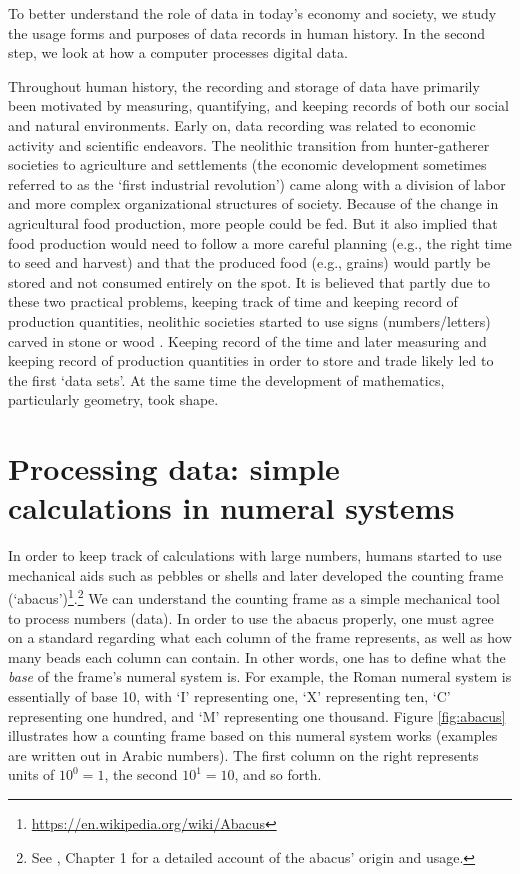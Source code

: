 \documentclass[
  12pt,
]{style/krantz}
\renewcommand{\href}[2]{#2\footnote{\url{#1}}}
\begin{document}
To better understand the role of data in today's economy and society, we study the usage forms and purposes of data records in human history. In the second step, we look at how a computer processes digital data.

Throughout human history, the recording and storage of data have primarily been motivated by measuring, quantifying, and keeping records of both our social and natural environments. Early on, data recording was related to economic activity and scientific endeavors. The neolithic transition from hunter-gatherer societies to agriculture and settlements (the economic development sometimes referred to as the `first industrial revolution') came along with a division of labor and more complex organizational structures of society. Because of the change in agricultural food production, more people could be fed. But it also implied that food production would need to follow a more careful planning (e.g., the right time to seed and harvest) and that the produced food (e.g., grains) would partly be stored and not consumed entirely on the spot. It is believed that partly due to these two practical problems, keeping track of time and keeping record of production quantities, neolithic societies started to use signs (numbers/letters) carved in stone or wood \citep{hogben_1983}. Keeping record of the time and later measuring and keeping record of production quantities in order to store and trade likely led to the first `data sets'. At the same time the development of mathematics, particularly geometry, took shape.

\hypertarget{processing-data-simple-calculations-in-numeral-systems}{%
\section{Processing data: simple calculations in numeral systems}\label{processing-data-simple-calculations-in-numeral-systems}}

In order to keep track of calculations with large numbers, humans started to use mechanical aids such as pebbles or shells and later developed the \href{https://en.wikipedia.org/wiki/Abacus}{counting frame (`abacus')}.\footnote{See \citet{hogben_1983}, Chapter 1 for a detailed account of the abacus' origin and usage.} We can understand the counting frame as a simple mechanical tool to process numbers (data). In order to use the abacus properly, one must agree on a standard regarding what each column of the frame represents, as well as how many beads each column can contain. In other words, one has to define what the \emph{base} of the frame's numeral system is. For example, the Roman numeral system is essentially of base 10, with `I' representing one, `X' representing ten, `C' representing one hundred, and `M' representing one thousand. Figure \ref{fig:abacus} illustrates how a counting frame based on this numeral system works (examples are written out in Arabic numbers). The first column on the right represents units of \(10^0=1\), the second \(10^1=10\), and so forth.
\end{document}
